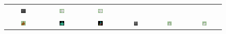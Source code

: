 \documentclass[10pt,journal,cspaper,compsoc]{IEEEtran}
\begin{document}
\begin{figure}[htbp]
\begin{center}
\begin{tabular}{cccccc}
\includegraphics[width=0.15\textwidth]{health_town_9.png} &
\includegraphics[width=0.15\textwidth]{health_town_11.png} &
\includegraphics[width=0.15\textwidth]{health_town_3.png} \\
\includegraphics[width=0.15\textwidth]{spitak_1.png} &
\includegraphics[width=0.15\textwidth]{spitak_2.png} &
\includegraphics[width=0.15\textwidth]{spitak_7.png} &
\includegraphics[width=0.15\textwidth]{spitak_9.png} &
\includegraphics[width=0.15\textwidth]{spitak_11.png} &
\includegraphics[width=0.15\textwidth]{spitak_3.png} \\

\end{tabular}
\end{center}
\end{figure}
\end{document}
